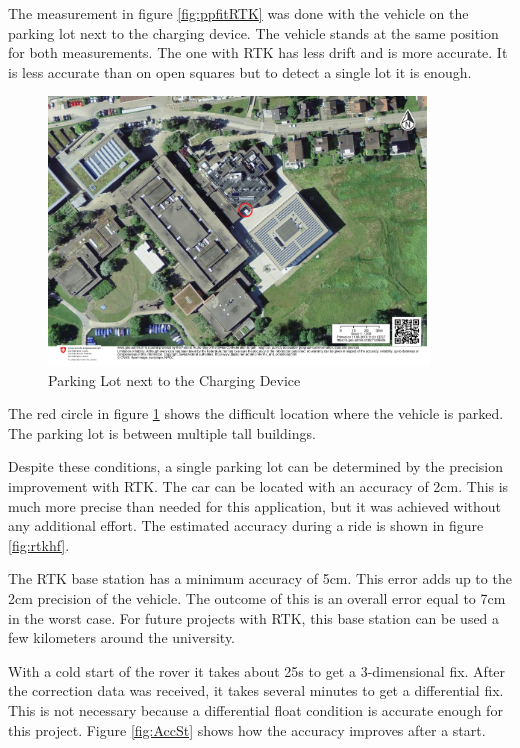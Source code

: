 The measurement in figure \ref{fig:ppfitRTK} was done with the vehicle on the parking lot next to the charging device. The vehicle stands at the same position for both measurements. The one with RTK has less drift and is more accurate. It is less accurate than on open squares but to detect a single lot it is enough.

\clearpage
\pagebreak

\begin{figure}[htb]
	\centering
	\includegraphics[width=0.9\textwidth]{images/mapHSR}
	\caption{Parking Lot next to the Charging Device}
	\label{fig:mapHSR}
\end{figure}

The red circle in figure \ref{fig:mapHSR} shows the difficult location where the vehicle is parked. The parking lot is between multiple tall buildings.

Despite these conditions, a single parking lot can be determined by the precision improvement with RTK.
The car can be located with an accuracy of 2\;cm. This is much more precise than needed for this application, but it was achieved without any additional effort. The estimated accuracy during a ride is shown in figure \ref{fig:rtkhf}.

The RTK base station has a minimum accuracy of 5\;cm. This error adds up to the 2\;cm precision of the vehicle. The outcome of this is an overall error equal to 7\;cm in the worst case. For future projects with RTK, this base station can be used a few kilometers around the university.

With a cold start of the rover it takes about 25\;s to get a 3-dimensional fix. After the correction data was received, it takes several minutes to get a differential fix. This is not necessary because a differential float condition is accurate enough for this project. Figure \ref{fig:AccSt} shows how the accuracy improves after a start. \cite{RTK_FIX/FLOAT}

